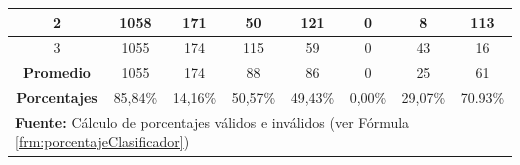 \begin{table}[H]
\begin{center}
\begin{tabular}{|c|c|c|c|c|c|c|c|}
2                    & 1058                                                                  & 171                                                            & 50                                                                & 121                                                                   & 0                                              & 8                                              & 113                                            \\ \hline
3                    & 1055                                                                  & 174                                                            & 115                                                               & 59                                                                    & 0                                              & 43                                             & 16                                           \\ \hline
\textbf{Promedio}    & 1055                                                                  & 174                                                            & 88                                                                & 86                                                                    & 0                                              & 25                                             & 61                                            \\ \hline
\textbf{Porcentajes} & 85,84\%                                                               & 14,16\%                                                        & 50,57\%                                                           & 49,43\%                                                               & 0,00\%                                         & 29,07\%                                        & 70.93\%                                            \\ \hline
\multicolumn{8}{l}{\textbf{Fuente:} C\'alculo de porcentajes v\'alidos e inv\'alidos (ver F\'ormula \ref{frm:porcentajeClasificador})}
\end{tabular}
\end{center}
\end{table}

